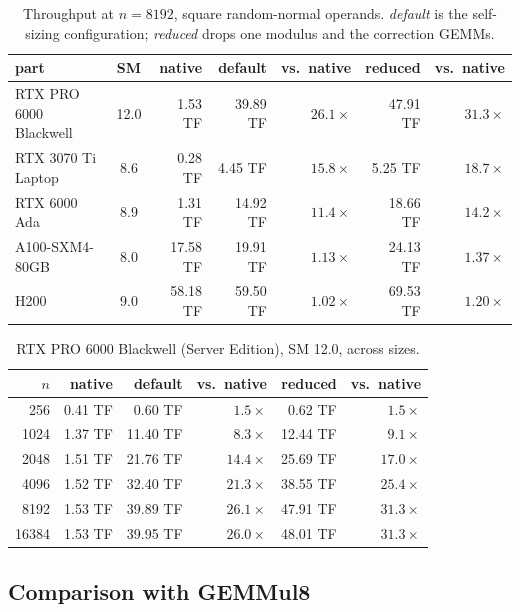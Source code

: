 \documentclass[11pt]{amsart}
\theoremstyle{plain}
\theoremstyle{definition}
\begin{document}
\begin{table}[t]
\centering
\caption{Throughput at $n = 8192$, square random-normal operands.
\emph{default} is the self-sizing configuration; \emph{reduced} drops one
modulus and the correction GEMMs.}
\label{tab:native}
\begin{tabular}{lcrrrrr}
\toprule
part & SM & native & default & vs.\ native & reduced & vs.\ native \\
\midrule
RTX PRO 6000 Blackwell & 12.0 & 1.53 TF & 39.89 TF & $26.1\times$ & 47.91 TF & $31.3\times$ \\
RTX 3070 Ti Laptop & 8.6 & 0.28 TF & 4.45 TF & $15.8\times$ & 5.25 TF & $18.7\times$ \\
RTX 6000 Ada & 8.9 & 1.31 TF & 14.92 TF & $11.4\times$ & 18.66 TF & $14.2\times$ \\
A100-SXM4-80GB & 8.0 & 17.58 TF & 19.91 TF & $1.13\times$ & 24.13 TF & $1.37\times$ \\
H200 & 9.0 & 58.18 TF & 59.50 TF & $1.02\times$ & 69.53 TF & $1.20\times$ \\
\bottomrule
\end{tabular}
\end{table}

\begin{table}[t]
\centering
\caption{RTX PRO 6000 Blackwell (Server Edition), SM 12.0, across sizes.}
\label{tab:blackwell}
\begin{tabular}{rrrrrr}
\toprule
$n$ & native & default & vs.\ native & reduced & vs.\ native \\
\midrule
256 & 0.41 TF & 0.60 TF & $1.5\times$ & 0.62 TF & $1.5\times$ \\
1024 & 1.37 TF & 11.40 TF & $8.3\times$ & 12.44 TF & $9.1\times$ \\
2048 & 1.51 TF & 21.76 TF & $14.4\times$ & 25.69 TF & $17.0\times$ \\
4096 & 1.52 TF & 32.40 TF & $21.3\times$ & 38.55 TF & $25.4\times$ \\
8192 & 1.53 TF & 39.89 TF & $26.1\times$ & 47.91 TF & $31.3\times$ \\
16384 & 1.53 TF & 39.95 TF & $26.0\times$ & 48.01 TF & $31.3\times$ \\
\bottomrule
\end{tabular}
\end{table}

\subsection{Comparison with GEMMul8}\label{sec:h2h}
\end{document}
